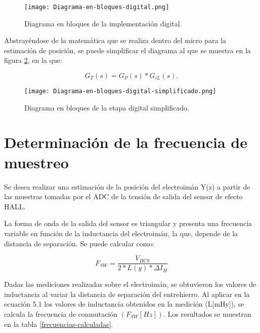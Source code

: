 \begin{figure}[H]
	\centering
	\texttt{[image: Diagrama-en-bloques-digital.png]}
	\caption{Diagrama en bloques de la implementación digital.}
	\label{fig:diag-en-bloques-digital}
\end{figure}

\noindent Abstrayéndose de la matemática que se realiza dentro del micro para la estimación de posición, se puede simplificar el diagrama al que se muestra en la figura \ref{fig:diag-en-bloques-digital-simplif}, en la que:

\begin{equation} 
	G_T(s) = G_P(s) * G_{iL}(s).
\end{equation}

\begin{figure}[H]
	\centering
	\texttt{[image: Diagrama-en-bloques-digital-simplificado.png]}
	\caption{Diagrama en bloques de la etapa digital simplificado.}
	\label{fig:diag-en-bloques-digital-simplif}
\end{figure}


\section{Determinación de la frecuencia de muestreo}

\noindent Se desea realizar una estimación de la posición del electroimán Y(z)  a partir de las muestras tomadas por el ADC de la tensión de salida del sensor de efecto HALL.

\noindent La forma de onda de la salida del sensor es triangular y presenta una frecuencia variable en función de la inductancia del electroimán, la que, depende de la distancia de separación. Se puede calcular como:

\begin{equation} \label{eq_frecuencia-de-muestreo}
	F_{SW}=\frac{V_{BUS}}{2 * L(y) * \Delta I_H}
\end{equation}

\noindent Dadas las mediciones realizadas sobre el electroimán, se obtuvieron los valores de inductancia al variar la distancia de separación del entrehierro. Al aplicar en la ecuación 5.1 los valores de inductancia obtenidos en la medición (L[mHy]), se calcula la frecuencia de conmutación  $(F_{SW}[Hz])$. Los resultados se muestran en la tabla \ref{frecuencias-calculadas}.


